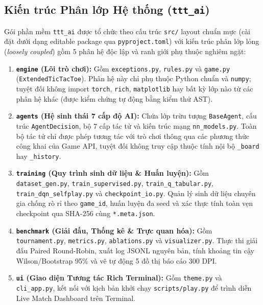\documentclass[a4paper,12pt]{report}
\begin{document}
\subsection{Kiến trúc Phân lớp Hệ thống (\texttt{ttt\_ai})}
Gói phần mềm \texttt{ttt\_ai} được tổ chức theo cấu trúc \texttt{src/} layout chuẩn mực (cài đặt dưới dạng editable package qua \texttt{pyproject.toml}) với kiến trúc phân lớp lỏng (\textit{loosely coupled}) gồm 5 phân hệ độc lập và ranh giới phụ thuộc nghiêm ngặt:

\begin{enumerate}[leftmargin=1.2cm]
    \item \textbf{\texttt{engine} (Lõi trò chơi):} Gồm \texttt{exceptions.py}, \texttt{rules.py} và \texttt{game.py} (\texttt{ExtendedTicTacToe}). Phân hệ này chỉ phụ thuộc Python chuẩn và \texttt{numpy}; tuyệt đối không import \texttt{torch}, \texttt{rich}, \texttt{matplotlib} hay bất kỳ lớp nào từ các phân hệ khác (được kiểm chứng tự động bằng kiểm thử AST).
    \item \textbf{\texttt{agents} (Hệ sinh thái 7 cấp độ AI):} Chứa lớp trừu tượng \texttt{BaseAgent}, cấu trúc \texttt{AgentDecision}, bộ 7 cấp tác tử và kiến trúc mạng \texttt{nn\_models.py}. Toàn bộ tác tử chỉ được phép tương tác với trò chơi thông qua các phương thức công khai của Game API, tuyệt đối không truy cập thuộc tính nội bộ \texttt{\_board} hay \texttt{\_history}.
    \item \textbf{\texttt{training} (Quy trình sinh dữ liệu \& Huấn luyện):} Gồm \texttt{dataset\_\allowbreak gen.py}, \texttt{train\_\allowbreak supervised.py}, \texttt{train\_\allowbreak q\_\allowbreak tabular.py}, \texttt{train\_\allowbreak dqn\_\allowbreak selfplay.py} và \texttt{checkpoint\_\allowbreak io.py}. Quản lý sinh dữ liệu chuyên gia chống rò rỉ theo \texttt{game\_\allowbreak id}, huấn luyện đa seed và xác thực tính toàn vẹn checkpoint qua SHA-256 cùng \texttt{*.meta.json}.
    \item \textbf{\texttt{benchmark} (Giải đấu, Thống kê \& Trực quan hóa):} Gồm \texttt{tournament.py}, \texttt{metrics.py}, \texttt{ablations.py} và \texttt{visualizer.py}. Thực thi giải đấu Paired Round-Robin, xuất log JSONL nguyên bản, tính khoảng tin cậy Wilson/Bootstrap 95\% và vẽ tự động 5 đồ thị báo cáo 300 DPI.
    \item \textbf{\texttt{ui} (Giao diện Tương tác Rich Terminal):} Gồm \texttt{theme.py} và \texttt{cli\_app.py}, kết nối với kịch bản khởi chạy \texttt{scripts/play.py} để trình diễn Live Match Dashboard trên Terminal.
\end{enumerate}
\end{document}
